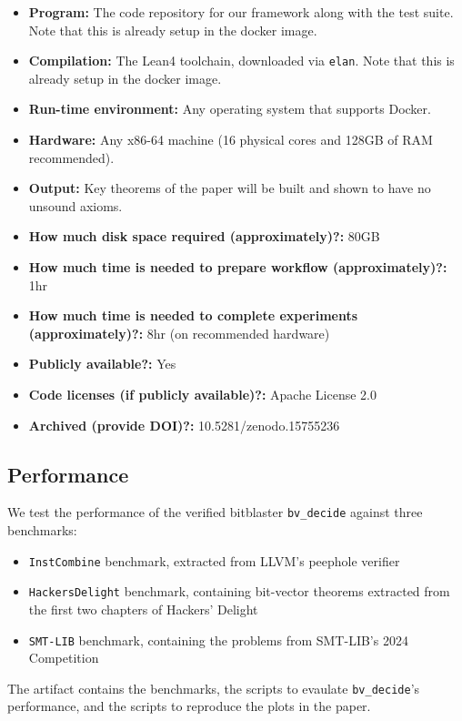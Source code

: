 \documentclass[acmlarge, nonacm]{acmart}
\begin{document}
{\small
\begin{itemize}
  \item {\bf Program: } The code repository for our framework along with the test suite. Note that this is already setup in the docker image.
  \item {\bf Compilation: } The Lean4 toolchain, downloaded via \texttt{elan}. Note that this is already setup in the docker image.
  \item {\bf Run-time environment: } Any operating system that supports Docker.
  \item {\bf Hardware: } Any x86-64 machine (16 physical cores and 128GB of RAM recommended).
  \item {\bf Output: } Key theorems of the paper will be built and shown to have no unsound axioms.
  \item {\bf How much disk space required (approximately)?: } 80GB
  \item {\bf How much time is needed to prepare workflow (approximately)?: } 1hr
  \item {\bf How much time is needed to complete experiments (approximately)?: } 8hr (on recommended hardware)
  \item {\bf Publicly available?: } Yes
  \item {\bf Code licenses (if publicly available)?: } Apache License 2.0
  \item {\bf Archived (provide DOI)?: } 10.5281/zenodo.15755236
\end{itemize}
}


\subsection{Performance}

We test the performance of the verified bitblaster \texttt{bv\_decide} against three benchmarks: 
\begin{itemize}
\item \texttt{InstCombine} benchmark, extracted from LLVM's peephole verifier
\item \texttt{HackersDelight} benchmark, containing bit-vector theorems extracted from the first two chapters of Hackers' Delight
\item \texttt{SMT-LIB} benchmark, containing the problems from SMT-LIB's 2024 Competition
\end{itemize}
The artifact contains the benchmarks, the scripts to evaulate \texttt{bv\_decide}'s performance, and the scripts to reproduce the plots in the paper.
\end{document}
